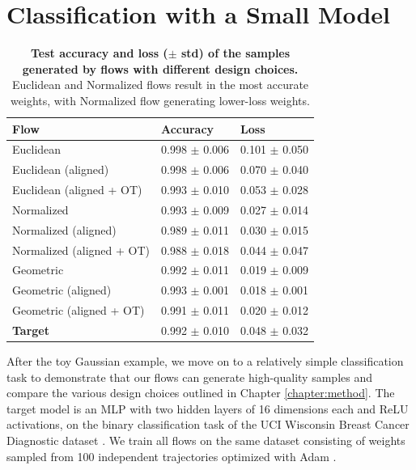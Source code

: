 \section{Classification with a Small Model} \label{sec:uci_classification}

\begin{table}[t!]
    \centering
    \begin{tabular}{lll}
        \toprule
        \textbf{Flow}  & \textbf{Accuracy} & \textbf{Loss} \\
        \midrule
        Euclidean                   & 0.998 $\pm$ 0.006     & 0.101 $\pm$ 0.050 \\ 
        Euclidean (aligned)         & 0.998 $\pm$ 0.006     & 0.070 $\pm$ 0.040 \\
        Euclidean (aligned + OT)    & 0.993 $\pm$ 0.010     & 0.053 $\pm$ 0.028 \\
        \midrule
        Normalized                  & 0.993 $\pm$ 0.009     & 0.027 $\pm$ 0.014 \\
        Normalized (aligned)        & 0.989 $\pm$ 0.011     & 0.030 $\pm$ 0.015 \\
        Normalized (aligned + OT)   & 0.988 $\pm$ 0.018	    & 0.044 $\pm$ 0.047 \\
        \midrule
        Geometric                   & 0.992 $\pm$ 0.011     & 0.019 $\pm$ 0.009 \\
        Geometric (aligned)         & 0.993 $\pm$ 0.001     & 0.018 $\pm$ 0.001 \\
        Geometric (aligned + OT)    & 0.991 $\pm$ 0.011 	& 0.020 $\pm$ 0.012 \\
        \midrule
        \textbf{Target}             & 0.992 $\pm$ 0.010     & 0.048 $\pm$ 0.032 \\
        \bottomrule
    \end{tabular}
    \caption{\label{tab:uci_class_table}\textbf{Test accuracy and loss ($\pm$ std) of the samples generated by flows with different design choices.} Euclidean and Normalized flows result in the most accurate weights, with Normalized flow generating lower-loss weights.}
\end{table}

After the toy Gaussian example, we move on to a relatively simple classification task to demonstrate that our flows can generate high-quality samples and compare the various design choices outlined in Chapter \ref{chapter:method}. The target model is an MLP with two hidden layers of 16 dimensions each and ReLU activations, on the binary classification task of the UCI Wisconsin Breast Cancer Diagnostic dataset \citep{streetNuclearFeatureExtraction1993}. We train all flows on the same dataset consisting of weights sampled from 100 independent trajectories optimized with Adam \citep{kingmaAdamMethodStochastic2017}. 

